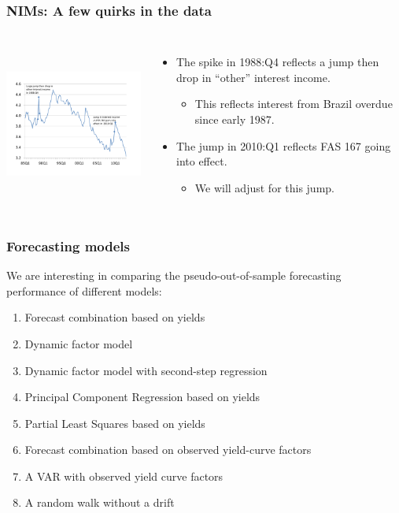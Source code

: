 \documentclass[handout]{beamer}
\begin{document}
\begin{frame}
\frametitle{NIMs:  A few quirks in the data}

\begin{columns}[4cm]

\column{7.2cm}
\includegraphics[height=5.4cm,width=7.2cm]{nims_bugs_crop.pdf}

\column{4.8cm}
\begin{itemize}
\item\vspace{-0.15in} The spike in 1988:Q4 reflects a jump then drop in ``other'' interest income.
\begin{itemize}
\item \vspace{0.075in} This reflects interest from Brazil overdue since early 1987.
\end{itemize}
\item \vspace{0.15in} The jump in 2010:Q1 reflects FAS 167 going into effect.
\begin{itemize}
\item \vspace{0.075in} We will adjust for this jump.
\end{itemize}
\end{itemize}
\end{columns}
\end{frame}

\begin{frame}
\frametitle{Forecasting models}

We are interesting in comparing the pseudo-out-of-sample forecasting performance of different models:
\begin{enumerate}
\item Forecast combination based on yields
\item Dynamic factor model
\item Dynamic factor model with second-step regression
\item Principal Component Regression based on yields
\item Partial Least Squares based on yields
\item Forecast combination based on observed yield-curve factors
\item A VAR with observed yield curve factors
\item A random walk without a drift
\end{enumerate}
\end{frame}
\end{document}
